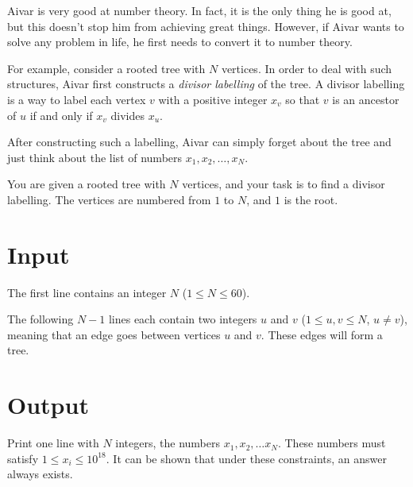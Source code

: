 
\noindent
Aivar is very good at number theory. In fact, it is the only thing he is good at, but this doesn't 
stop him from achieving great things. However, if Aivar wants to solve any problem in life, he first needs
to convert it to number theory.

For example, consider a rooted tree with $N$ vertices. In order to deal with such structures, Aivar first 
constructs a \textit{divisor labelling} of the tree. A divisor labelling is a way to label each 
vertex $v$ with a positive integer $x_v$ so that $v$ is an ancestor of $u$ if and only if $x_v$ divides
$x_u$.

After constructing such a labelling, Aivar can simply forget about the tree and just think about the 
list of numbers $x_1, x_2, \dots, x_N$.

You are given a rooted tree with $N$ vertices, and your task is to find a divisor labelling. 
The vertices are numbered from $1$ to $N$, and $1$ is the root.


\section*{Input}
The first line contains an integer $N$ ($1 \leq N \leq 60$).

The following $N-1$ lines each contain two integers $u$ and $v$ ($1 \leq u, v \leq N$, $u \neq v$),
meaning that an edge goes between vertices $u$ and $v$. These edges will form a tree.


\section*{Output}

Print one line with $N$ integers, the numbers $x_1, x_2, \dots x_N$. These numbers must 
satisfy $1 \leq x_i \leq 10^{18}$. It can be shown that under these constraints, an answer
always exists.
